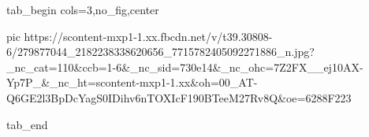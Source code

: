  
 
 
 
 


\ifcmt
  tab_begin cols=3,no_fig,center

     pic https://scontent-mxp1-1.xx.fbcdn.net/v/t39.30808-6/279877044_2182238338620656_7715782405092271886_n.jpg?_nc_cat=110&ccb=1-6&_nc_sid=730e14&_nc_ohc=7Z2FX__ej10AX-Yp7P_&_nc_ht=scontent-mxp1-1.xx&oh=00_AT-Q6GE2l3BpDcYagS0IDihv6nTOXIcF190BTeeM27Rv8Q&oe=6288F223

  tab_end
\fi
